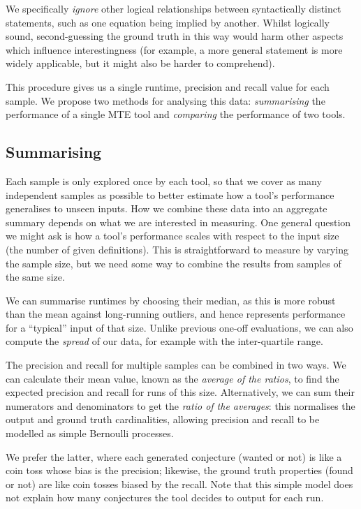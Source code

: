 We specifically \emph{ignore} other logical relationships between syntactically
distinct statements, such as one equation being implied by another. Whilst
logically sound, second-guessing the ground truth in this way would harm other
aspects which influence interestingness (for example, a more general statement
is more widely applicable, but it might also be harder to comprehend).

This procedure gives us a single runtime, precision and recall value for each
sample. We propose two methods for analysing this data: \emph{summarising}
the performance of a single MTE tool and \emph{comparing} the performance of two
tools.

\subsection{Summarising}

Each sample is only explored once by each tool, so that we cover as many
independent samples as possible to better estimate how a tool's performance
generalises to unseen inputs. How we combine these data into an aggregate
summary depends on what we are interested in measuring. One general question we
might ask is how a tool's performance scales with respect to the input size (the
number of given definitions). This is straightforward to measure by varying the
sample size, but we need some way to combine the results from samples of the
same size.

We can summarise runtimes by choosing their median, as this is more robust than
the mean against long-running outliers, and hence represents performance for a
``typical'' input of that size. Unlike previous one-off evaluations, we can also
compute the \emph{spread} of our data, for example with the inter-quartile
range.

The precision and recall for multiple samples can be combined in two ways. We
can calculate their mean value, known as the \emph{average of the ratios}, to
find the expected precision and recall for runs of this size. Alternatively, we
can sum their numerators and denominators to get the \emph{ratio of the
  averages}: this normalises the output and ground truth cardinalities, allowing
precision and recall to be modelled as simple Bernoulli processes.

We prefer the latter, where each generated conjecture (wanted or not) is like a
coin toss whose bias is the precision; likewise, the ground truth properties
(found or not) are like coin tosses biased by the recall. Note that this simple
model does not explain how many conjectures the tool decides to output for each
run.

